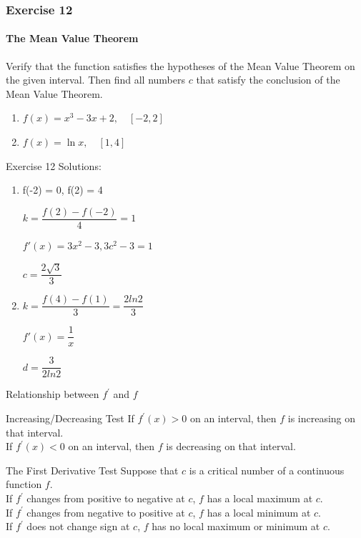 \begin{frame}
    \frametitle{Exercise 12}
    \framesubtitle{The Mean Value Theorem}
    Verify that the function satisfies the hypotheses of the Mean Value Theorem on the given interval. Then find all numbers $c$ that satisfy the conclusion of the Mean Value Theorem.
    \begin{enumerate}
        \item $f(x)=x^{3}-3 x+2, \quad[-2,2]$
        \item $f(x)=\ln x, \quad[1,4]$
    \end{enumerate}
\end{frame}



\begin{frame}{Exercise 12}
    Solutions:
    \begin{enumerate}
        \item f(-2) = 0, f(2) = 4

              $k = \dfrac{f(2) - f(-2)}{4} = 1$

              $f'(x) = 3x^2 - 3, 3c^2 - 3 = 1$

              $c = \dfrac{2\sqrt{3}}{3}$
        \item
              $k = \dfrac{f(4) - f(1)}{3} = \dfrac{2ln2}{3}$

              $f'(x) = \dfrac{1}{x}$

              $d = \dfrac{3}{2ln2}$

    \end{enumerate}
\end{frame}





\begin{frame}{Relationship between $f^\prime$ and $f$}
    \begin{block}{Increasing/Decreasing Test}
        If $f^\prime(x)>0$ on an interval, then $f$ is increasing on that interval.\\
        If $f^\prime(x)<0$ on an interval, then $f$ is decreasing on that interval.\\
    \end{block}
    \begin{block}{The First Derivative Test}
        Suppose that $c$ is a critical number of a continuous function $f$.\\
        If $f^\prime$ changes from positive to negative at $c$, $f$ has a local maximum at $c$.\\
        If $f^\prime$ changes from negative to positive at $c$, $f$ has a local minimum at $c$.\\
        If $f^\prime$ does not change sign at $c$, $f$ has no local maximum or minimum at $c$.
    \end{block}
\end{frame}



